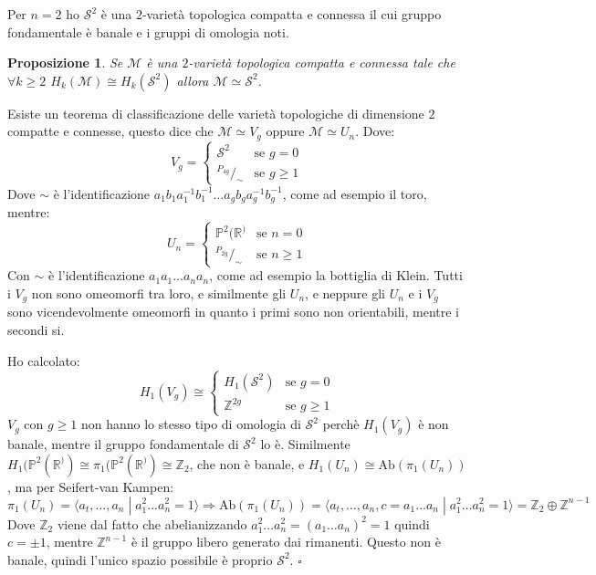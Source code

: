 \documentclass[10pt, twoside=false, x11names]{scrbook}
\newtheorem{proposition}[theorem]{Proposizione}
\newenvironment{proof}{{\textbf{Dimostrazione}:}}{\hfill $\square$}
\newcommand{\M}{\mathcal{M}}
\newcommand{\Z}{\mathbb{Z}}
\newcommand{\RN}[1][]{\mathbb{R}^#1}
\newcommand{\Sph}[1][]{\mathcal{S}^#1}
\newcommand{\Ab}[1]{\mathrm{Ab}\left( #1 \right)}
\newcommand*\quot[2]{{^{\textstyle #1}\big/_{\textstyle #2}}}
\begin{document}
Per $ n = 2 $ ho $ \Sph{2} $ è una $ 2 $-varietà topologica compatta e connessa
il cui gruppo fondamentale è banale e i gruppi di omologia noti.

\begin{proposition}
  Se $ \M $ è una $ 2 $-varietà topologica compatta e connessa tale che $ \forall k \geq 2 $
  $ H_k(\M) \cong H_k(\Sph{2}) $ allora $ \M \simeq \Sph{2} $.
\end{proposition}
\begin{proof}
  Esiste un teorema di classificazione delle varietà topologiche di dimensione $ 2 $
  compatte e connesse, questo dice che $ \M \simeq V_g $ oppure $ \M \simeq U_n $.
  Dove:
  \[
    V_g =
    \begin{cases}
      \Sph{2} & \text{se } g = 0 \\
      \quot{P_{4g}}{\sim} & \text{se } g \geq 1
    \end{cases}
  \]
  Dove $ \sim $ è l'identificazione $ a_1 b_1 a_1^{-1}b_1^{-1}\dots a_g b_g a_g^{-1}b_g^{-1} $,
  come ad esempio il toro, mentre:
  \[
    U_n =
    \begin{cases}
      \mathbb{P}^2(\RN) & \text{se } n = 0 \\
      \quot{P_{2g}}{\sim} & \text{se } n \geq 1
    \end{cases}
  \]
  Con $ \sim $ è l'identificazione $ a_1 a_1 \dots a_n a_n $, come ad esempio
  la bottiglia di Klein.
  Tutti i $ V_g $ non sono omeomorfi tra loro, e similmente gli $ U_n $, e neppure
  gli $ U_n $ e i $ V_g $ sono vicendevolmente omeomorfi in quanto i primi sono
  non orientabili, mentre i secondi si.

  Ho calcolato:
  \[
    H_1(V_g) \cong
    \begin{cases}
      H_1(\Sph{2}) & \text{se } g = 0 \\
      \Z^{2g} & \text{se } g \geq 1
    \end{cases}
  \]
  $ V_g $ con $ g \geq 1 $ non hanno lo stesso tipo di omologia di $ \Sph{2} $ perchè
  $ H_1(V_g) $ è non banale, mentre il gruppo fondamentale di $ \Sph{2} $ lo è.
  Similmente $ H_1(\mathbb{P}^2(\RN)) \cong \pi_1(\mathbb{P}^2(\RN)) \cong \Z_2 $, che non è
  banale, e $ H_1(U_n) \cong \Ab{\pi_1(U_n)} $, ma per Seifert-van Kampen:
  \[
    \pi_1(U_n) = \langle a_t, \dots, a_n \; | \; a_1^2\dots a_n^2 = 1 \rangle \Rightarrow \Ab{\pi_1(U_n)} = \langle a_t, \dots, a_n, c = a_1 \dots a_n \; | \; a_1^2\dots a_n^2 = 1 \rangle =
    \Z_2 \oplus \Z^{n-1}
  \]
  Dove $ \Z_2 $ viene dal fatto che abelianizzando $ a_1^2\dots a_n^2 = (a_1 \dots a_n)^2 = 1 $ quindi
  $ c = \pm 1 $, mentre $ \Z^{n-1} $ è il gruppo libero generato dai rimanenti.
  Questo non è banale, quindi l'unico spazio possibile è proprio $ \Sph{2} $.
\end{proof}
\end{document}
